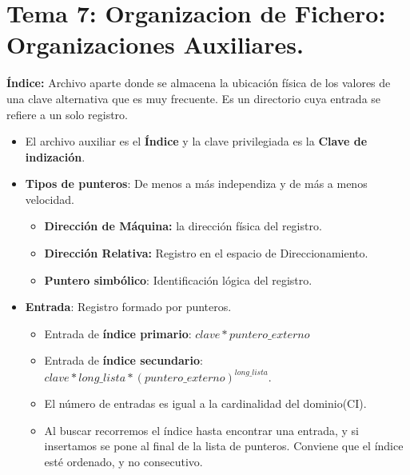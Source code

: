 \documentclass[12pt, twoside, openright]{report} %
\begin{document}
  
\chapter{Tema 7: Organizacion de Fichero: Organizaciones Auxiliares.}



  
  \textbf{Índice:} Archivo aparte donde se almacena la ubicación física
  de los valores de una clave alternativa que es muy frecuente. Es un
  directorio cuya entrada se refiere a un solo registro.
  

  \begin{itemize}
  \item El archivo auxiliar es el \textbf{Índice} y la clave privilegiada es
    la \textbf{Clave de indización}.
    
  \item \textbf{Tipos de punteros}: De menos a más independiza y de más a
    menos velocidad.
    

    \begin{itemize}
    \item \textbf{Dirección de Máquina:} la dirección física del registro.
      
    \item \textbf{Dirección Relativa:} Registro en el espacio de
      Direccionamiento.
      
    \item \textbf{Puntero simbólico}: Identificación lógica del registro.
      
    \end{itemize}
  \item \textbf{Entrada}: Registro formado por punteros.
    

    \begin{itemize}
    \item Entrada de \textbf{índice primario}: $clave * puntero\_externo$
      
    \item Entrada de \textbf{índice secundario}: $clave * long\_lista * (puntero\_externo)^{long\_lista}$.
      
    \item El número de entradas es igual a la cardinalidad del dominio(CI).
      
    \item Al buscar recorremos el índice hasta encontrar una entrada, y si
      insertamos se pone al final de la lista de punteros. Conviene que
      el índice esté ordenado, y no consecutivo.
      

\end{itemize}
\end{itemize}
\end{document}
